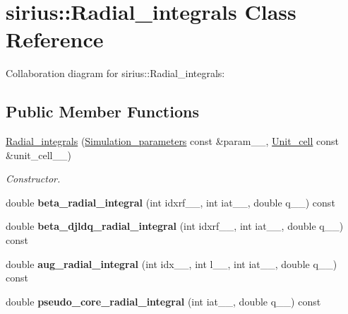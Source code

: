 \hypertarget{classsirius_1_1_radial__integrals}{}\section{sirius\+:\+:Radial\+\_\+integrals Class Reference}
\label{classsirius_1_1_radial__integrals}


Collaboration diagram for sirius\+:\+:Radial\+\_\+integrals\+:
\subsection*{Public Member Functions}
\begin{DoxyCompactItemize}
\item 
\hyperlink{classsirius_1_1_radial__integrals_aa82d7549474635ee14b3fbb819d0d369}{Radial\+\_\+integrals} (\hyperlink{classsirius_1_1_simulation__parameters}{Simulation\+\_\+parameters} const \&param\+\_\+\+\_\+, \hyperlink{classsirius_1_1_unit__cell}{Unit\+\_\+cell} const \&unit\+\_\+cell\+\_\+\+\_\+)
\begin{DoxyCompactList}\small\item\em Constructor. \end{DoxyCompactList}\item 
\hypertarget{classsirius_1_1_radial__integrals_a649527f381d3a662533ee08954ac6db2}{}double {\bfseries beta\+\_\+radial\+\_\+integral} (int idxrf\+\_\+\+\_\+, int iat\+\_\+\+\_\+, double q\+\_\+\+\_\+) const \label{classsirius_1_1_radial__integrals_a649527f381d3a662533ee08954ac6db2}

\item 
\hypertarget{classsirius_1_1_radial__integrals_a6ac483771dee831c00d392f2af88e0af}{}double {\bfseries beta\+\_\+djldq\+\_\+radial\+\_\+integral} (int idxrf\+\_\+\+\_\+, int iat\+\_\+\+\_\+, double q\+\_\+\+\_\+) const \label{classsirius_1_1_radial__integrals_a6ac483771dee831c00d392f2af88e0af}

\item 
\hypertarget{classsirius_1_1_radial__integrals_a90fbfaa1ecf851a94edb57866b9226f5}{}double {\bfseries aug\+\_\+radial\+\_\+integral} (int idx\+\_\+\+\_\+, int l\+\_\+\+\_\+, int iat\+\_\+\+\_\+, double q\+\_\+\+\_\+) const \label{classsirius_1_1_radial__integrals_a90fbfaa1ecf851a94edb57866b9226f5}

\item 
\hypertarget{classsirius_1_1_radial__integrals_a553643ca75da87fe08426fdd5bd62ec6}{}double {\bfseries pseudo\+\_\+core\+\_\+radial\+\_\+integral} (int iat\+\_\+\+\_\+, double q\+\_\+\+\_\+) const \label{classsirius_1_1_radial__integrals_a553643ca75da87fe08426fdd5bd62ec6}


\end{DoxyCompactItemize}
